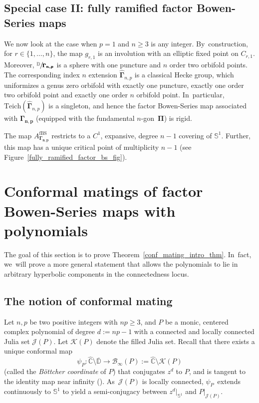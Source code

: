 \documentclass[JEP,XML,SOM,Unicode,NoFloatCountersInSection,published]{cedram}
\let\faktor\sfrac
\theoremstyle{definition}
\theoremstyle{remark}
\newcommand{\C}{\mathbb{C}}
\newcommand{\D}{\mathbb{D}}
\begin{document}
\subsection{Special case II: fully ramified factor Bowen-Series maps}\label{hecke_factor_bs_subsec}

We now look at the case when $p=1$ and $n\geq 3$ is any integer. By~construction, for $r\in\{1,\dots,n\}$, the map $g_{r,1}$ is an involution with an elliptic fixed point on $C_{r,1}$. Moreover, $\faktor{\D}{\pmb{\Gamma_{n,p}}}$ is a sphere with one puncture and $n$ order two orbifold points. The corresponding index $n$ extension $\widehat{\pmb{\Gamma}}_{n,p}$ is a classical Hecke group, which uniformizes a genus zero orbifold with exactly one puncture, exactly one order two orbifold point and exactly one order $n$ orbifold point. In~particular, $\mathrm{Teich}(\widehat{\pmb{\Gamma}}_{n,p})$ is a singleton, and hence the factor Bowen-Series map associated with $\pmb{\Gamma_{n,p}}$ (equipped with the fundamental $n$-gon~$\pmb{\Pi}$) is rigid.

The map $A_{\pmb{\Gamma_{n,p}}}^{\mathrm{fBS}}$ restricts to a $C^1$, expansive, degree $n-1$ covering of $\mathbb{S}^1$. Further, this map has a unique critical point of multiplicity $n-1$ (see Figure~\ref{fully_ramified_factor_bs_fig}).

\section{Conformal matings of factor Bowen-Series maps with polynomials}\label{conf_mating_sec}

The goal of this section is to prove Theorem~\ref{conf_mating_intro_thm}. In~fact, we~will prove a more general statement that allows the polynomials to lie in arbitrary hyperbolic components in the connectedness locus.

\subsection{The notion of conformal mating}\label{conf_mating_def_subsec}

Let $n, p$ be two positive integers with \hbox{$np\geq 3$}, and $P$ be a monic, centered complex polynomial of degree $d:=np-1$ with a connected and locally connected Julia set $\mathcal{J}(P)$. Let $\mathcal{K}(P)$ denote the filled Julia set.
Recall that there exists a unique conformal map
\[
\psi_P:\widehat{\C}\setminus\overline{\D}\to\mathcal{B}_\infty(P):=\widehat{\C}\setminus\mathcal{K}(P)
\]
(called the \emph{Böttcher coordinate} of $P$) that conjugates $z^{d}$ to $P$, and is tangent to the identity map near infinity (\cf \cite[Th.\,9.1]{Mil06}). As~$\mathcal{J}(P)$ is locally connected, $\psi_P$~extends continuously to $\mathbb{S}^1$ to yield a semi-conjugacy between $z^d\vert_{\mathbb{S}^1}$ and $P\vert_{\mathcal{J}(P)}$.
\end{document}
